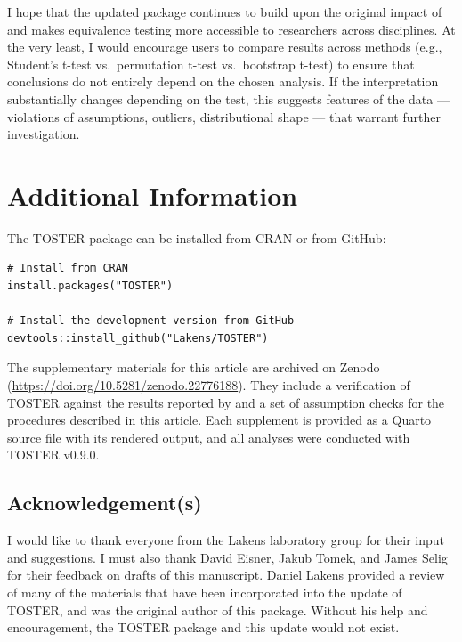 \documentclass[]{interact}
\theoremstyle{plain}%
\theoremstyle{definition}
\theoremstyle{remark}
\begin{document}
I hope that the updated package continues to build upon the original
impact of \citet{lakens_ori} and makes equivalence testing more
accessible to researchers across disciplines. At the very least, I would
encourage users to compare results across methods (e.g., Student's
t-test vs.~permutation t-test vs.~bootstrap t-test) to ensure that
conclusions do not entirely depend on the chosen analysis. If the
interpretation substantially changes depending on the test, this
suggests features of the data --- violations of assumptions, outliers,
distributional shape --- that warrant further investigation.

\newpage

\section{Additional Information}\label{additional-information}

The TOSTER package can be installed from CRAN or from GitHub:

\begin{verbatim}
# Install from CRAN
install.packages("TOSTER")

# Install the development version from GitHub
devtools::install_github("Lakens/TOSTER")
\end{verbatim}

The supplementary materials for this article are archived on Zenodo
(\url{https://doi.org/10.5281/zenodo.22776188}). They include a
verification of TOSTER against the results reported by
\citet{Campbell_2021} and a set of assumption checks for the procedures
described in this article. Each supplement is provided as a Quarto
source file with its rendered output, and all analyses were conducted
with TOSTER v0.9.0.

\subsection*{Acknowledgement(s)}\label{acknowledgements}

I would like to thank everyone from the Lakens laboratory group for
their input and suggestions. I must also thank David Eisner, Jakub
Tomek, and James Selig for their feedback on drafts of this manuscript.
Daniel Lakens provided a review of many of the materials that have been
incorporated into the update of TOSTER, and was the original author of
this package. Without his help and encouragement, the TOSTER package and
this update would not exist.
\end{document}
